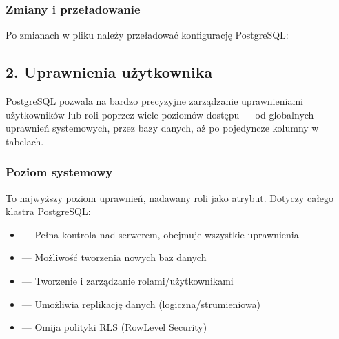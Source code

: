 \documentclass[letterpaper,10pt,polish]{sphinxmanual}
\begin{document}
\subsubsection{Zmiany i przeładowanie}
\label{\detokenize{rozdzial2/bezpieczenstwo/index:zmiany-i-przeladowanie}}
\sphinxAtStartPar
Po zmianach w pliku należy przeładować konfigurację PostgreSQL:

\begin{sphinxVerbatim}[commandchars=\\\{\}]
 
 
 
\end{sphinxVerbatim}


\subsection{2. Uprawnienia użytkownika}
\label{\detokenize{rozdzial2/bezpieczenstwo/index:uprawnienia-uzytkownika}}
\sphinxAtStartPar
PostgreSQL pozwala na bardzo precyzyjne zarządzanie uprawnieniami użytkowników lub roli poprzez wiele poziomów dostępu — od globalnych uprawnień systemowych, przez bazy danych, aż po pojedyncze kolumny w tabelach.


\subsubsection{Poziom systemowy}
\label{\detokenize{rozdzial2/bezpieczenstwo/index:poziom-systemowy}}
\sphinxAtStartPar
To najwyższy poziom uprawnień, nadawany roli jako atrybut. Dotyczy całego klastra PostgreSQL:
\begin{itemize}
\item {} 
\sphinxAtStartPar
{} — Pełna kontrola nad serwerem, obejmuje wszystkie uprawnienia

\item {} 
\sphinxAtStartPar
{} — Możliwość tworzenia nowych baz danych

\item {} 
\sphinxAtStartPar
{} — Tworzenie i zarządzanie rolami/użytkownikami

\item {} 
\sphinxAtStartPar
{} — Umożliwia replikację danych (logiczna/strumieniowa)

\item {} 
\sphinxAtStartPar
{} — Omija polityki RLS (Row\sphinxhyphen{}Level Security)

\end{itemize}
\end{document}
